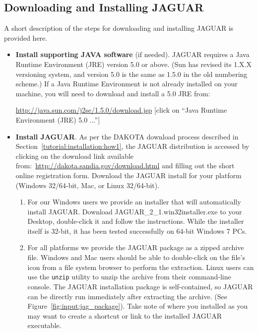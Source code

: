 \subsection{Downloading and Installing JAGUAR}

A short description of the steps for downloading and installing JAGUAR
is provided here.

\begin{itemize}
\item \textbf{Install supporting JAVA software} (if needed).  JAGUAR
  requires a Java Runtime Environment (JRE) version 5.0 or above. (Sun
  has revised its 1.X.X versioning system, and version 5.0 is the same
  as 1.5.0 in the old numbering scheme.)  If a Java Runtime
  Environment is not already installed on your machine, you will need
  to download and install a 5.0 JRE from:

\url{http://java.sun.com/j2se/1.5.0/download.jsp} 
{\small [click on ``Java Runtime Environment (JRE) 5.0 ...'']}

\item \textbf{Install JAGUAR}.  As per the DAKOTA download process
  described in Section~\ref{tutorial:installation:how1}, the JAGUAR
  distribution is accessed by clicking on the download link available
  from:~\url{http://dakota.sandia.gov/download.html} and
  filling out the short online registration form.  Download the JAGUAR
  install for your platform (Windows 32/64-bit, Mac, or Linux 32/64-bit).

\begin{enumerate}

\item For our Windows users we provide an installer that will
  automatically install JAGUAR.  Download
  JAGUAR\_2\_1.win32installer.exe to your Desktop, double-click it and
  follow the instructions.  While the installer itself is 32-bit, it
  has been tested successfully on 64-bit Windows 7 PCs.

\item For all platforms we provide the JAGUAR package as a zipped archive file. 
Windows and Mac users should be able to double-click on the file's icon from a
file system browser to perform the extraction. Linux users can use
the {\tt unzip} utility to unzip the archive from their command-line
console.  The JAGUAR installation package is self-contained, so JAGUAR
can be directly run immediately after extracting the archive. (See
Figure~\ref{fig:input:jag_package}). Take note of where you installed
as you may want to create a shortcut or link to the installed JAGUAR 
executable.
\end{enumerate}


\end{itemize}
